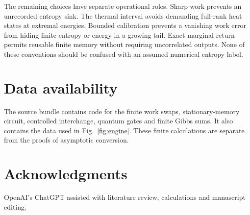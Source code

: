 \documentclass[11pt,a4paper]{article}
\begin{document}
The remaining choices have separate operational roles. Sharp work prevents an unrecorded entropy sink. The thermal interval avoids demanding full-rank heat states at extremal energies. Bounded calibration prevents a vanishing work error from hiding finite entropy or energy in a growing tail. Exact marginal return permits reusable finite memory without requiring uncorrelated outputs. None of these conventions should be confused with an assumed numerical entropy label.

\section*{Data availability}
The source bundle contains code for the finite work swaps, stationary-memory circuit, controlled interchange, quantum gates and finite Gibbs sums. It also contains the data used in Fig.~\ref{fig:engine}. These finite calculations are separate from the proofs of asymptotic conversion.

\section*{Acknowledgments}
OpenAI's ChatGPT assisted with literature review, calculations and manuscript editing.

\appendix









\end{document}
